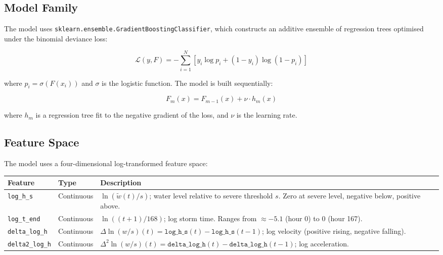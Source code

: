 \documentclass[11pt,a4paper]{article}
\begin{document}
\mkmframework

\subsection{Model Family}
The model uses \texttt{sklearn.ensemble.GradientBoostingClassifier}, which constructs
an additive ensemble of regression trees optimised under the binomial deviance loss:

\[
\mathcal{L}(y, F) = -\sum_{i=1}^{N} \left[ y_i \log p_i + (1 - y_i) \log(1 - p_i) \right]
\]

where $p_i = \sigma(F(x_i))$ and $\sigma$ is the logistic function. The model is built
sequentially:

\[
F_m(x) = F_{m-1}(x) + \nu \cdot h_m(x)
\]

where $h_m$ is a regression tree fit to the negative gradient of the loss, and $\nu$
is the learning rate.

\subsection{Feature Space}
The model uses a four-dimensional log-transformed feature space:

\begin{center}
\begin{tabular}{llp{7.5cm}}
\toprule
\textbf{Feature} & \textbf{Type} & \textbf{Description} \\
\midrule
\texttt{log\_h\_s} & Continuous &
    $\ln\!\left(\tilde{w}(t) / s\right)$; water level relative to severe threshold $s$.
    Zero at severe level, negative below, positive above. \\
\texttt{log\_t\_end} & Continuous &
    $\ln\!\left((t{+}1) / 168\right)$; log storm time.
    Ranges from $\approx{-5.1}$ (hour 0) to $0$ (hour 167). \\
\texttt{delta\_log\_h} & Continuous &
    $\Delta\ln(w/s)(t) = \texttt{log\_h\_s}(t) - \texttt{log\_h\_s}(t{-}1)$;
    log velocity (positive rising, negative falling). \\
\texttt{delta2\_log\_h} & Continuous &
    $\Delta^2\ln(w/s)(t) = \texttt{delta\_log\_h}(t) - \texttt{delta\_log\_h}(t{-}1)$;
    log acceleration. \\
\bottomrule
\end{tabular}
\end{center}
\end{document}

